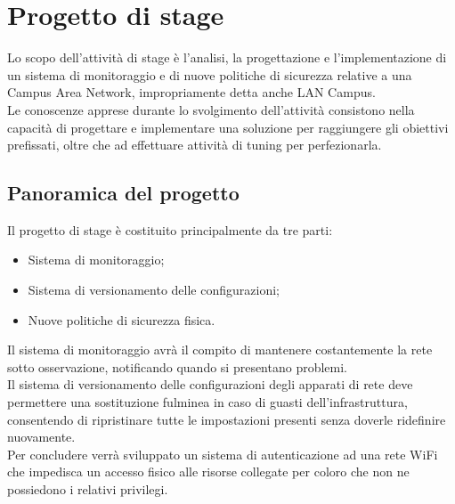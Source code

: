 \documentclass[Tesi.tex]{subfiles}
\begin{document}
\clearpage\thispagestyle{empty}\mbox{}\clearpage
\newpage

\chapter{Progetto di stage}
Lo scopo dell'attività di stage è l’analisi, la progettazione e l'implementazione di un sistema di monitoraggio e di nuove politiche di sicurezza relative a una Campus Area Network, impropriamente detta anche LAN Campus. \\
Le conoscenze apprese durante lo svolgimento dell'attività consistono nella capacità di progettare e implementare una soluzione per raggiungere gli obiettivi prefissati, oltre che ad effettuare attività di tuning per perfezionarla.


\section{Panoramica del progetto}

Il progetto di stage è costituito principalmente da tre parti:
\begin{itemize}
	\item Sistema di monitoraggio;
	\item Sistema di versionamento delle configurazioni;
	\item Nuove politiche di sicurezza fisica.
\end{itemize}

Il sistema di monitoraggio avrà il compito di mantenere costantemente la rete sotto osservazione, notificando quando si presentano problemi. \\
Il sistema di versionamento delle configurazioni degli apparati di rete deve permettere una sostituzione fulminea in caso di guasti dell'infrastruttura, consentendo di ripristinare tutte le impostazioni presenti senza doverle ridefinire nuovamente. \\
Per concludere verrà sviluppato un sistema di autenticazione ad una rete WiFi che impedisca un accesso fisico alle risorse collegate per coloro che non ne possiedono i relativi privilegi.\\
\end{document}
